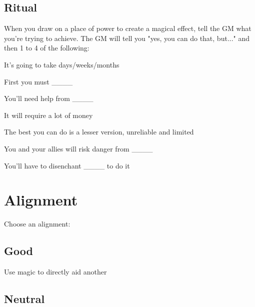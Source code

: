  
\subsection{Ritual}   
 

When you draw on a place of power to create a magical effect, tell the GM what you're trying to achieve. The GM will tell you "yes, you can do that, but..." and then 1 to 4 of the following:

 
\startitemize[1,packed]

\item It's going to take days/weeks/months

 
\item First you must \_\_\_\_

 
\item You'll need help from \_\_\_\_

 
\item It will require a lot of money

 
\item The best you can do is a lesser version, unreliable and limited

 
\item You and your allies will risk danger from \_\_\_\_

 
\item You'll have to disenchant \_\_\_\_ to do it


\stopitemize




 
\section{Alignment}   
 
\startInstructionsAfterHeader
Choose an alignment:
\stopInstructionsAfterHeader
 


\subsection{Good}   
 

Use magic to directly aid another

 
\subsection{Neutral}   
 


